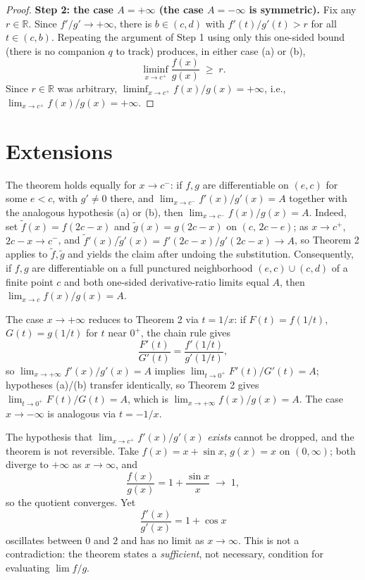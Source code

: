 \documentclass{essay}
\begin{document}
\begin{proof}
  \medskip
  \textbf{Step 2: the case \(A=+\infty\) (the case \(A=-\infty\) is symmetric).} Fix any \(r\in\mathbb{R}\). Since \(f'/g'\to+\infty\), there is \(b\in(c,d)\) with \(f'(t)/g'(t) > r\) for all \(t\in(c,b)\). Repeating the argument of Step 1 using only this one-sided bound (there is no companion \(q\) to track) produces, in either case (a) or (b),
  \[ \liminf_{x\to c^+}\frac{f(x)}{g(x)} \;\ge\; r. \]
  Since \(r\in\mathbb{R}\) was arbitrary, \(\liminf_{x\to c^+} f(x)/g(x) = +\infty\), i.e., \(\lim_{x\to c^+} f(x)/g(x) = +\infty\).
\end{proof}

\section{Extensions}

\begin{corollary}
  The theorem holds equally for \(x\to c^-\): if \(f,g\) are differentiable on \((e,c)\) for some \(e<c\), with \(g'\neq 0\) there, and \(\lim_{x\to c^-} f'(x)/g'(x) = A\) together with the analogous hypothesis (a) or (b), then \(\lim_{x\to c^-} f(x)/g(x) = A\). Indeed, set \(\tilde{f}(x) = f(2c-x)\) and \(\tilde{g}(x)=g(2c-x)\) on \((c,\,2c-e)\); as \(x\to c^+\), \(2c-x\to c^-\), and \(\tilde{f}'(x)/\tilde{g}'(x) = f'(2c-x)/g'(2c-x) \to A\), so Theorem 2 applies to \(\tilde{f},\tilde{g}\) and yields the claim after undoing the substitution. Consequently, if \(f,g\) are differentiable on a full punctured neighborhood \((e,c)\cup(c,d)\) of a finite point \(c\) and both one-sided derivative-ratio limits equal \(A\), then \(\lim_{x\to c} f(x)/g(x) = A\).
\end{corollary}

\begin{corollary}
  The case \(x\to+\infty\) reduces to Theorem 2 via \(t=1/x\): if \(F(t)=f(1/t)\), \(G(t)=g(1/t)\) for \(t\) near \(0^+\), the chain rule gives
  \[ \frac{F'(t)}{G'(t)} = \frac{f'(1/t)}{g'(1/t)}, \]
  so \(\lim_{x\to+\infty} f'(x)/g'(x) = A\) implies \(\lim_{t\to 0^+} F'(t)/G'(t) = A\); hypotheses (a)/(b) transfer identically, so Theorem 2 gives \(\lim_{t\to 0^+} F(t)/G(t) = A\), which is \(\lim_{x\to+\infty} f(x)/g(x) = A\). The case \(x\to-\infty\) is analogous via \(t=-1/x\).
\end{corollary}

\begin{remark}
  The hypothesis that \(\lim_{x\to c^+} f'(x)/g'(x)\) \emph{exists} cannot be dropped, and the theorem is not reversible. Take \(f(x) = x+\sin x\), \(g(x)=x\) on \((0,\infty)\); both diverge to \(+\infty\) as \(x\to\infty\), and
  \[ \frac{f(x)}{g(x)} = 1+\frac{\sin x}{x} \;\longrightarrow\; 1, \]
  so the quotient converges. Yet
  \[ \frac{f'(x)}{g'(x)} = 1+\cos x \]
  oscillates between \(0\) and \(2\) and has no limit as \(x\to\infty\). This is not a contradiction: the theorem states a \emph{sufficient}, not necessary, condition for evaluating \(\lim f/g\).
\end{remark}
\end{document}
